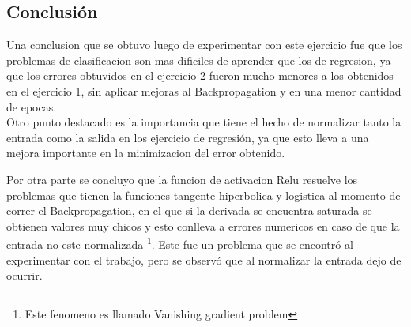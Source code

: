 \subsection{Conclusión}
Una conclusion que se obtuvo luego de experimentar con este ejercicio fue que los problemas de clasificacion son mas dificiles de aprender que los de regresion, ya que
los errores obtuvidos en el ejercicio 2 fueron mucho menores a los obtenidos en el ejercicio 1, sin aplicar mejoras al Backpropagation y en una menor cantidad de epocas. \\
Otro punto destacado es la importancia que tiene el hecho de normalizar tanto la entrada como la salida en los ejercicio de regresión, ya que esto lleva a una mejora importante
en la minimizacion del error obtenido.

Por otra parte se concluyo que la funcion de activacion Relu resuelve los problemas que tienen la funciones tangente hiperbolica y logistica al momento de correr el Backpropagation,
en el que si la derivada se encuentra saturada se obtienen valores muy chicos y esto conlleva a errores numericos en caso de que la entrada no este normalizada \footnote{Este fenomeno es llamado Vanishing gradient problem}. Este fue un problema
que se encontró al experimentar con el trabajo, pero se observó que al normalizar la entrada dejo de ocurrir. 

